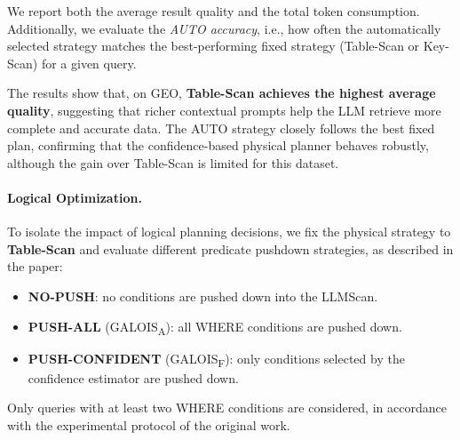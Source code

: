 We report both the average result quality and the total token consumption. 
Additionally, we evaluate the \emph{AUTO accuracy}, i.e., how often the automatically selected strategy matches the best-performing fixed strategy (Table-Scan or Key-Scan) for a given query.

\begin{table}[ht]
    \centering
    \caption{Physical optimization results on GEO (AVG-Score and token usage).}
    \label{tab:exp2-physical}
\end{table}

The results show that, on GEO, \textbf{Table-Scan achieves the highest average quality}, suggesting that richer contextual prompts help the LLM retrieve more complete and accurate data.
The AUTO strategy closely follows the best fixed plan, confirming that the confidence-based physical planner behaves robustly, although the gain over Table-Scan is limited for this dataset.

\paragraph{Logical Optimization.}
To isolate the impact of logical planning decisions, we fix the physical strategy to \textbf{Table-Scan} and evaluate different predicate pushdown strategies, as described in the paper:
\begin{itemize}
    \item \textbf{NO-PUSH}: no conditions are pushed down into the LLMScan.
    \item \textbf{PUSH-ALL} (\textsc{GALOIS\textsubscript{A}}): all WHERE conditions are pushed down.
    \item \textbf{PUSH-CONFIDENT} (\textsc{GALOIS\textsubscript{F}}): only conditions selected by the confidence estimator are pushed down.
\end{itemize}

Only queries with at least two WHERE conditions are considered, in accordance with the experimental protocol of the original work.

